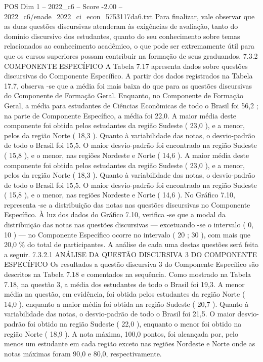 \begin{textsample}{POS Dim 1 – 2022\_c6 – Score -2.00 – 2022\_c6/enade\_2022\_ci\_econ\_5753117da6.txt}
Para finalizar, vale observar que as duas questões discursivas atenderam às exigências de avaliação, tanto do domínio discursivo dos estudantes, quanto do seu conhecimento sobre temas relacionados ao conhecimento acadêmico, o que pode ser extremamente útil para que os cursos superiores possam contribuir na formação de seus graduandos. 7.3.2 COMPONENTE ESPECÍFICO A Tabela 7.17 apresenta dados sobre questões discursivas do Componente Específico.
A partir dos dados registrados na Tabela 17.7, observa -se que a média foi mais baixa do que para as questões discursivas do Componente de Formação Geral.
Enquanto, no Componente de Formação Geral, a média para estudantes de Ciências Econômicas de todo o Brasil foi 56,2 ; na parte de Componente Específico, a média foi 22,0.
A maior média deste componente foi obtida pelos estudantes da região Sudeste ( 23,0 ), e a menor, pelos da região Norte ( 18,3 ).
Quanto à variabilidade das notas, o desvio-padrão de todo o Brasil foi 15,5.
O maior desvio-padrão foi encontrado na região Sudeste ( 15,8 ), e o menor, nas regiões Nordeste e Norte ( 14,6 ).
A maior média deste componente foi obtida pelos estudantes da região Sudeste ( 23,0 ), e a menor, pelos da região Norte ( 18,3 ).
Quanto à variabilidade das notas, o desvio-padrão de todo o Brasil foi 15,5.
O maior desvio-padrão foi encontrado na região Sudeste ( 15,8 ), e o menor, nas regiões Nordeste e Norte ( 14,6 ).
No Gráfico 7.10, representa -se a distribuição das notas nas questões discursivas no Componente Específico.
À luz dos dados do Gráfico 7.10, verifica -se que a modal da distribuição das notas nas questões discursivas — excetuando -se o intervalo ( 0, 10 ) — no Componente Específico ocorre no intervalo ( 20 ; 30 ), com mais que 20,0 \% do total de participantes.
A análise de cada uma destas questões será feita a seguir. 7.3.2.1 ANÁLISE DA QUESTÃO DISCURSIVA 3 DO COMPONENTE ESPECÍFICO Os resultados a questão discursiva 3 do Componente Específico são descritos na Tabela 7.18 e comentados na sequência.
Como mostrado na Tabela 7.18, na questão 3, a média dos estudantes de todo o Brasil foi 19,3.
A menor média na questão, em evidência, foi obtida pelos estudantes da região Norte ( 14,0 ), enquanto a maior média foi obtida na região Sudeste ( 20,7 ).
Quanto à variabilidade das notas, o desvio-padrão de todo o Brasil foi 21,5.
O maior desvio-padrão foi obtido na região Sudeste ( 22,0 ), enquanto o menor foi obtido na região Norte ( 18,9 ).
A nota máxima, 100,0 pontos, foi alcançada por, pelo menos um estudante em cada região exceto nas regiões Nordeste e Norte onde as notas máximas foram 90,0 e 80,0, respectivamente.

\end{textsample}
